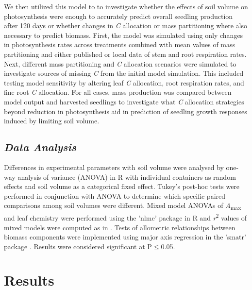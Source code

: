 \documentclass[a4paper]{article}\usepackage[]{graphicx}\usepackage[]{color}
\begin{document}
We then utilized this model to to investigate whether the effects of soil volume on photosynthesis were enough to accurately predict overall seedling production after 120 days or whether changes in \textit{C} allocation or mass partitioning where also necessary to predict biomass. First, the model was simulated using only changes in photosynthesis rates across treatments combined with mean values of mass partitioning and either published or local data of stem and root respiration rates. Next, different mass partitioning and \textit{C} allocation scenarios were simulated to investigate sources of missing \textit{C} from the initial model simulation. This included testing model sensitivity by altering leaf \textit{C} allocation, root respiration rates, and fine root \textit{C} allocation. For all cases, mass production was compared between model output and harvested seedlings to investigate what \textit{C} allocation strategies beyond reduction in photosynthesis aid in  prediction of seedling growth responses induced by limiting soil volume. 

\subsection*{\textit{Data Analysis}}
Differences in experimental parameters with soil volume were analysed by one-way analysis of variance (ANOVA) in R with individual containers as random effects and soil volume as a categorical fixed effect. Tukey’s post-hoc tests were performed in conjunction with ANOVA to determine which specific paired comparisons among soil volumes were different. Mixed model ANOVAs of \textit{A}\textsubscript{max} and leaf chemistry were performed using the 'nlme' package \citep{nlme} in R and \textit{r}\textsuperscript{2} values of mixed models were computed as in \citet{nakagawa2013general}. Tests of allometric relationships between biomass components were implemented using major axis regression in the 'smatr' package \citep{warton2012smatr}. Results were considered significant at P$\leq$0.05.

\section*{Results}
\end{document}
